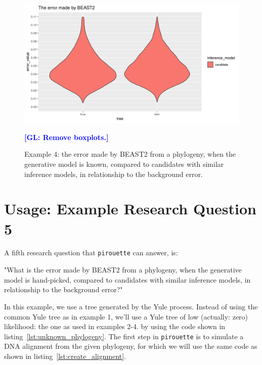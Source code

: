 \documentclass{article}
\newcommand{\giovanni}[1]{\textcolor{blue}{\textbf{[GL: #1]}}}
\begin{document}
\begin{figure}[ht]
  \includegraphics[width=\textwidth]{example_4_errors.png}
  \caption{
    Example 4: the error made by BEAST2 from a phylogeny, when the generative model is known, compared to candidates with similar inference models, in relationship to the background error.
  }
  \label{fig:example_4}
  \giovanni{Remove boxplots.}
\end{figure}


\section{Usage: Example Research Question 5}

A fifth research question that \verb;pirouette; can answer, is:

"What is the error made by BEAST2 from a phylogeny, 
when the generative model is hand-picked, 
compared to candidates with similar inference models, 
in relationship to the background error?"

In this example, we use a tree generated by the Yule process.
Instead of using the common Yule tree as in example 1, we'll use
a Yule tree of low (actually: zero) likelihood: 
the one as used in examples 2-4.
by using the code shown in listing~\ref{lst:unknown_phylogeny}.
The first step in \verb;pirouette; is to simulate a DNA alignment 
from the given phylogeny, for which we will use the same code 
as shown in listing~\ref{lst:create_alignment}.
\end{document}
